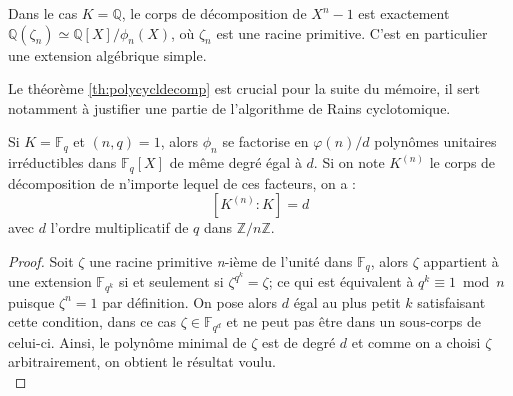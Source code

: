 \documentclass[a4paper]{article} %
\numberwithin{section}{part}
\numberwithin{equation}{section}
\newcommand\nroot[1]{\textit{#1}-ième}
\newcommand\zmodn[1]{\mathbb{Z}/#1\mathbb{Z}}
\newcommand\GF[1]{\mathbb{F}_{#1}}
\newcommand\QQ{\mathbb{Q}}
\begin{document}
\begin{rem}
Dans le cas $K = \QQ$, le corps de décomposition de $X^n - 1$ est exactement 
$\QQ(\zeta_n) \simeq \QQ[X]/\phi_n(X)$, où $\zeta_n$ est une racine primitive. 
C'est en particulier une extension algébrique simple.
\end{rem}

Le théorème \ref{th:polycycldecomp} est crucial pour la suite du mémoire, il 
sert notamment à justifier une partie de l'algorithme de Rains cyclotomique.

\begin{thm}
\label{th:polycycldecomp}
Si $K = \GF{q}$ et $(n,q) = 1$, alors $\phi_n$ se factorise en $\varphi(n)/d$ 
polynômes unitaires irréductibles dans $\GF{q}[X]$ de même degré égal à $d$. Si
on note $K^{(n)}$ le corps de décomposition de n'importe lequel de ces facteurs,
on a :
\[[K^{(n)}:K] = d\]
avec $d$ l'ordre multiplicatif de $q$ dans $\zmodn{n}$.
\end{thm}
\begin{proof}
Soit $\zeta$ une racine primitive \nroot{n} de l'unité dans $\GF{q}$, alors 
$\zeta$ appartient à une extension $\GF{q^k}$ si et seulement si $\zeta^{q^k} = 
\zeta$; ce qui est équivalent à $q^k \equiv 1 \bmod n$ puisque $\zeta^n = 1$ par
définition. On pose alors $d$ égal au plus petit $k$ satisfaisant cette 
condition, dans ce cas $\zeta\in\GF{q^d}$ et ne peut pas être dans un sous-corps
de celui-ci. Ainsi, le polynôme minimal de $\zeta$ est de degré $d$ et comme on 
a choisi $\zeta$ arbitrairement, on obtient le résultat voulu.\\
\end{proof}
\end{document}
